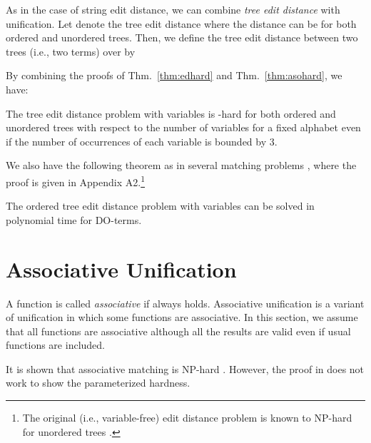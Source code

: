 \documentclass[a4paper]{llncs}
\begin{document}
As in the case of string edit distance,
we can combine \emph{tree edit distance} \cite{bille05}
with unification.
Let  denote the tree edit distance where
the distance can be for both ordered and unordered trees.
Then, we define the tree edit distance 
between two trees (i.e., two terms) over 
by

By combining the proofs of Thm.~\ref{thm:edhard} and
Thm.~\ref{thm:asohard}, we have:

\begin{theorem}
The tree edit distance problem
with variables is -hard for both ordered and unordered trees
with respect to
the number of variables for a fixed alphabet even if
the number of occurrences of each variable is bounded by 3.
\label{thm:tree-ed-hard}
\end{theorem}

We also have the following theorem as in several matching problems
\cite{benanav87},
where the proof is given in Appendix A2.\footnote{
The original (i.e., variable-free) edit distance problem is known to NP-hard
for unordered trees \cite{bille05}.}

\begin{theorem}
The ordered tree edit distance problem with variables
can be solved in polynomial time for DO-terms.
\label{thm:tree-ed-do}
\end{theorem}

\section{Associative Unification}

A function  is called \emph{associative} if
 always holds.
Associative unification is a variant of unification
in which some functions are associative.
In this section, we assume that all functions are associative
although all the results are valid even if usual functions are included.

It is shown that associative matching is NP-hard \cite{benanav87}.
However, the proof in \cite{benanav87} does not work to show
the parameterized hardness.
\end{document}
